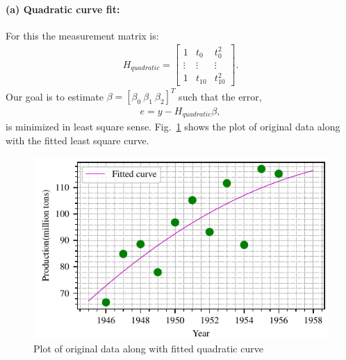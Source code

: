 \paragraph{(a) Quadratic curve fit:}For this the measurement matrix is:
\begin{align*}
H_{quadratic} = \begin{bmatrix}1 & t_0 & t_0^2\\ \vdots & \vdots & \vdots\\1 & t_{10} & t_{10}^2\end{bmatrix}.
\end{align*}
Our goal is to estimate $\beta = [\beta_0\ \beta_1\ \beta_2]^T$ such that the error,
\begin{align*}
e = y - H_{quadratic}\beta,
\end{align*}
is minimized in least square sense. Fig.~\ref{fig:fit_quadratic} shows the plot of original data along with the fitted least square curve.
\begin{figure}[h]
	\centering
	\includegraphics[scale=1.0,trim={0cm 0cm 0cm 0cm},clip]{./code/generatedPlots/fit_quadratic.pdf}
	\caption{Plot of original data along with fitted quadratic curve}
	\label{fig:fit_quadratic}
\end{figure}
